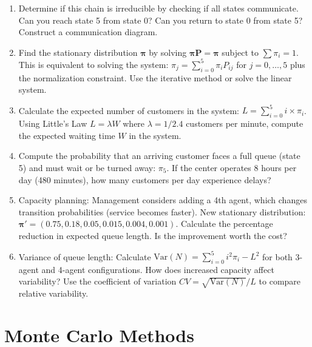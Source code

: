 \documentclass[12pt]{article}
\begin{document}
\begin{enumerate}[label=(\alph*)]
\item Determine if this chain is irreducible by checking if all states communicate. Can you reach state 5 from state 0? Can you return to state 0 from state 5? Construct a communication diagram.

\item Find the stationary distribution $\boldsymbol{\pi}$ by solving $\boldsymbol{\pi}\mathbf{P} = \boldsymbol{\pi}$ subject to $\sum \pi_i = 1$. This is equivalent to solving the system: $\pi_j = \sum_{i=0}^{5} \pi_i P_{ij}$ for $j=0,\ldots,5$ plus the normalization constraint. Use the iterative method or solve the linear system.

\item Calculate the expected number of customers in the system: $L = \sum_{i=0}^{5} i \times \pi_i$. Using Little's Law $L = \lambda W$ where $\lambda = 1/2.4$ customers per minute, compute the expected waiting time $W$ in the system.

\item Compute the probability that an arriving customer faces a full queue (state 5) and must wait or be turned away: $\pi_5$. If the center operates 8 hours per day (480 minutes), how many customers per day experience delays?

\item Capacity planning: Management considers adding a 4th agent, which changes transition probabilities (service becomes faster). New stationary distribution: $\boldsymbol{\pi}' = (0.75, 0.18, 0.05, 0.015, 0.004, 0.001)$. Calculate the percentage reduction in expected queue length. Is the improvement worth the cost?

\item Variance of queue length: Calculate $\text{Var}(N) = \sum_{i=0}^{5} i^2\pi_i - L^2$ for both 3-agent and 4-agent configurations. How does increased capacity affect variability? Use the coefficient of variation $CV = \sqrt{\text{Var}(N)}/L$ to compare relative variability.
\end{enumerate}


\section{Monte Carlo Methods}
\end{document}
